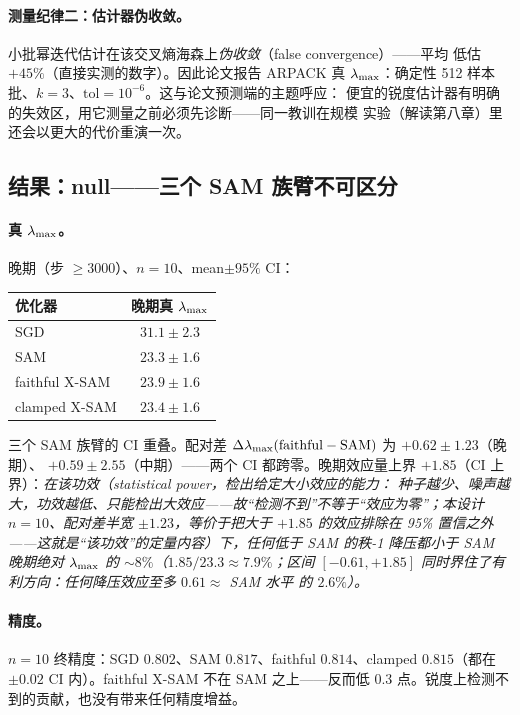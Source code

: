 \paragraph{测量纪律二：估计器伪收敛。}
小批幂迭代估计在该交叉熵海森上\emph{伪收敛}（false convergence）——平均
低估 $+45\%$（直接实测的数字）。因此论文报告 ARPACK 真 $\lambda_{\max}$：确定性
512 样本批、$k{=}3$、$\mathrm{tol}{=}10^{-6}$。这与论文预测端的主题呼应：
便宜的锐度估计器有明确的失效区，用它测量之前必须先诊断——同一教训在规模
实验（解读第八章）里还会以更大的代价重演一次。

\subsection{结果：null——三个 SAM 族臂不可区分}
\label{sec:ch06-result}

\paragraph{真 $\lambda_{\max}$。}
晚期（步 $\geq3000$）、$n{=}10$、mean$\pm95\%$ CI：
\begin{center}
\begin{tabular}{lc}
\toprule
优化器 & 晚期真 $\lambda_{\max}$ \\
\midrule
SGD & $31.1\pm2.3$ \\
SAM & $23.3\pm1.6$ \\
faithful X-SAM & $23.9\pm1.6$ \\
clamped X-SAM & $23.4\pm1.6$ \\
\bottomrule
\end{tabular}
\end{center}
三个 SAM 族臂的 CI 重叠。配对差
$\Delta\lambda_{\max}(\text{faithful}-\text{SAM})$ 为 $+0.62\pm1.23$（晚期）、
$+0.59\pm2.55$（中期）——两个 CI 都跨零。晚期效应量上界 $+1.85$（CI
上界）：\emph{在该功效（statistical power，检出给定大小效应的能力：
种子越少、噪声越大，功效越低、只能检出大效应——故``检测不到''不等于``效应为零''；本设计 $n{=}10$、配对差半宽 $\pm1.23$，等价于把大于
$+1.85$ 的效应排除在 95\% 置信之外——这就是``该功效''的定量内容）下，任何低于 SAM 的秩-1 降压都小于 SAM 晚期绝对
$\lambda_{\max}$ 的 $\sim8\%$（$1.85/23.3\approx7.9\%$；区间 $[-0.61,+1.85]$
同时界住了\emph{有利}方向：任何降压效应至多 $0.61\approx$ SAM 水平
的 $2.6\%$）。}

\paragraph{精度。}
$n{=}10$ 终精度：SGD $0.802$、SAM $0.817$、faithful $0.814$、clamped
$0.815$（都在 $\pm0.02$ CI 内）。faithful X-SAM 不在 SAM 之上——反而低
$0.3$ 点。锐度上检测不到的贡献，也没有带来任何精度增益。

